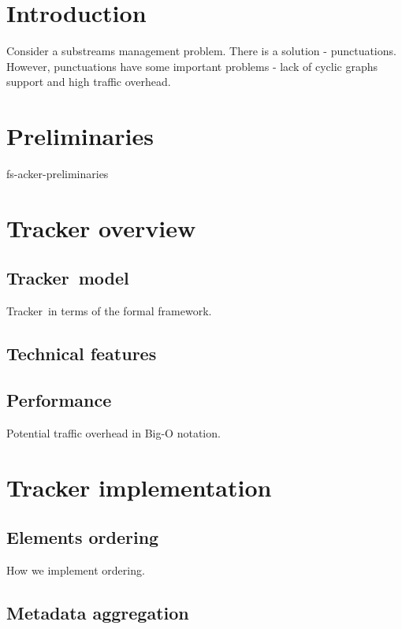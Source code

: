 \documentclass{vldb}
\newcommand {\tracker} {Tracker}
\begin{document}

\thispagestyle{empty}

\section {Introduction}

Consider a substreams management problem. There is a solution -  punctuations. However, punctuations have some important problems - lack of cyclic graphs support and high traffic overhead. 

\section{Preliminaries}
 {fs-acker-preliminaries}

\section{Tracker overview}

\subsection{\tracker\ model}

\tracker\ in terms of the formal framework.

\subsection{Technical features}

\subsection{Performance}

Potential traffic overhead in Big-O notation.

\section{Tracker implementation}

\subsection{Elements ordering}

How we implement ordering.

\subsection{Metadata aggregation}
\end{document}
